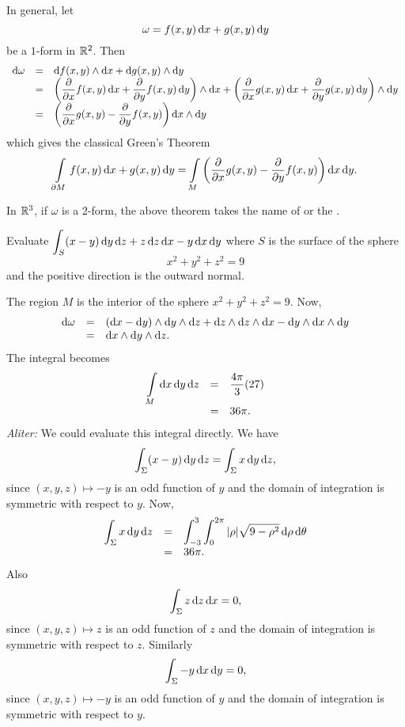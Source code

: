 In general, let $$ \omega = f(x,y)\d{x} + g(x,y)\d{y}  $$ be a
$1$-form in $\mathbb{R} ^2$. Then
 $$\begin{array}{lll} \d{\omega}  & =  & \d{f(x,y)}\wedge\d{x} + \d{g(x,y)}\wedge\d{y} \\
 &=& \left(\dfrac{\partial }{\partial x}f(x,y)\d{x}+ \dfrac{\partial }{\partial y}f(x,y)\d{y}\right)\wedge\d{x}
 +  \left(\dfrac{\partial }{\partial x}g(x,y)\d{x}+ \dfrac{\partial }{\partial
 y}g(x,y)\d{y}\right)\wedge\d{y}\\
 & = &  \left(\dfrac{\partial }{\partial x}g(x,y)- \dfrac{\partial }{\partial y}f(x,y)\right)\d{x}\wedge\d{y}
 \end{array}$$
which gives the classical Green's Theorem
$$  \dint \limits _{\partial M}  f(x,y)\d{x} + g(x,y)\d{y} = \dint \limits _M   \left(\dfrac{\partial }{\partial x}g(x,y)- \dfrac{\partial }{\partial y}f(x,y)\right)\d{x}\d{y}.$$

In $\mathbb{R}^3$, if $\omega$ is a 2-form, the above theorem takes the
name of  or the .

\bigskip

\begin{exa}
 Evaluate $\dint _S (x - y)\d{y}  \d{z} + z\d{z}  \d{x}- y\d{x} \d{y}$ where $S$ is the surface of the sphere $$x^2 + y^2 + z^2 = 9$$
and the positive direction is the outward normal.
\end{exa}
\begin{solu} The region $M$ is the interior of the sphere $x^2 + y^2 + z^2
= 9$. Now,
$$\begin{array}{lll}\d{\omega} &  = & (\d{x}- \d{y}) \wedge\d{y} \wedge \d{z}
+ \d{z}\wedge\d{z} \wedge \d{x}-  \d{y}\wedge\d{x}\wedge \d{y} \\
& = &  \d{x}\wedge \d{y} \wedge \d{z}. \\
\end{array}$$
The integral becomes
$$\begin{array}{lll}\dint \limits_M \d{x} \d{y}  \d{z} & = &  \dfrac{4\pi}{3}(27)\\ &  = & 36\pi. \end{array}$$
{\em Aliter:} We could evaluate this integral directly. We have
$$\dint _\Sigma (x - y)\d{y}  \d{z}  = \dint _\Sigma x\d{y}  \d{z},
$$since $(x, y , z) \mapsto -y$ is an odd function of $y$ and the
domain of integration is symmetric with respect to $y$. Now,
$$\begin{array}{lll}\dint _\Sigma x\d{y}  \d{z} & = &
\dint_{-3} ^3 \dint _0 ^{2\pi} |\rho|\sqrt{9 - \rho^2}\d{\rho}
\d{\theta}
\\
& = &  36\pi.
\end{array}
$$
Also
$$\dint _\Sigma z\d{z} \d{x}= 0,
$$since $(x, y , z) \mapsto z$ is an odd function of $z$ and the
domain of integration is symmetric with respect to $z$. Similarly
$$\dint _\Sigma -y\d{x} \d{y}   = 0,
$$since $(x, y , z) \mapsto -y$ is an odd function of $y$ and the
domain of integration is symmetric with respect to $y$.
\end{solu}

